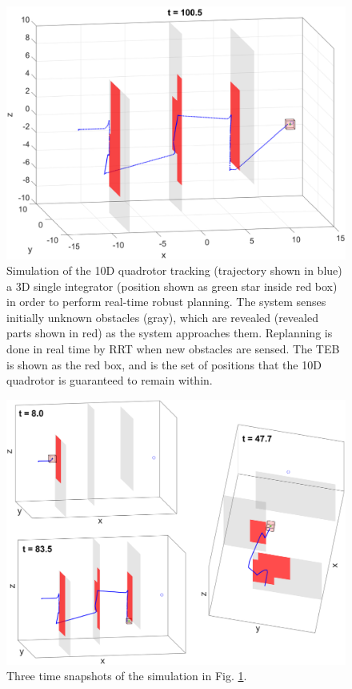 \begin{figure}
  \includegraphics[width=\columnwidth]{fig/Q10D_Q3D/10050}
  \caption{Simulation of the 10D quadrotor tracking (trajectory shown in blue) a 3D single integrator (position shown as green star inside red box) in order to perform real-time robust planning. The system senses initially unknown obstacles (gray), which are revealed (revealed parts shown in red) as the system approaches them. Replanning is done in real time by RRT when new obstacles are sensed. The TEB is shown as the red box, and is the set of positions that the 10D quadrotor is guaranteed to remain within.}
  \label{fig:simRRT}
\end{figure}

\begin{figure}
  \includegraphics[width=\columnwidth]{fig/Q10D_Q3D/combined}
  \caption{Three time snapshots of the simulation in Fig. \ref{fig:simRRT}.}
  \label{fig:simRRT_combined}  
\end{figure}

